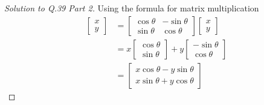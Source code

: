 \begin{proof}[Solution to Q.39 Part 2]
  Using the formula for matrix multiplication
  \begin{align*}
    [\rot] \begin{bmatrix} x \\ y \end{bmatrix}
    &= \begin{bmatrix} \cos \theta & - \sin \theta \\ \sin \theta & \cos \theta \end{bmatrix} \begin{bmatrix} x \\ y \end{bmatrix}\\
    &= x \begin{bmatrix} \cos \theta \\ \sin \theta \end{bmatrix} + y \begin{bmatrix} -\sin \theta \\ \cos \theta \end{bmatrix} \\
    &= \begin{bmatrix} x \cos \theta - y \sin \theta \\ x \sin \theta + y \cos \theta \end{bmatrix}
  \end{align*}
\end{proof}
